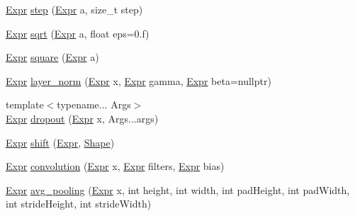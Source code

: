 \begin{DoxyCompactItemize}
\item 
\hyperlink{namespacemarian_a498d8baf75b754011078b890b39c8e12}{Expr} \hyperlink{namespacemarian_a2e7193e67292a4c3347f296f5e669581}{step} (\hyperlink{namespacemarian_a498d8baf75b754011078b890b39c8e12}{Expr} a, size\+\_\+t step)
\item 
\hyperlink{namespacemarian_a498d8baf75b754011078b890b39c8e12}{Expr} \hyperlink{namespacemarian_ac5f147047403fcdab5481c89dc1d8212}{sqrt} (\hyperlink{namespacemarian_a498d8baf75b754011078b890b39c8e12}{Expr} a, float eps=0.f)
\item 
\hyperlink{namespacemarian_a498d8baf75b754011078b890b39c8e12}{Expr} \hyperlink{namespacemarian_a953e6df1fb209a142e066a2546d88c8a}{square} (\hyperlink{namespacemarian_a498d8baf75b754011078b890b39c8e12}{Expr} a)
\item 
\hyperlink{namespacemarian_a498d8baf75b754011078b890b39c8e12}{Expr} \hyperlink{namespacemarian_a6202278a9da8ca8a281a6a96e75082f6}{layer\+\_\+norm} (\hyperlink{namespacemarian_a498d8baf75b754011078b890b39c8e12}{Expr} x, \hyperlink{namespacemarian_a498d8baf75b754011078b890b39c8e12}{Expr} gamma, \hyperlink{namespacemarian_a498d8baf75b754011078b890b39c8e12}{Expr} beta=nullptr)
\item 
{\footnotesize template$<$typename... Args$>$ }\\\hyperlink{namespacemarian_a498d8baf75b754011078b890b39c8e12}{Expr} \hyperlink{namespacemarian_a268400392f22176821c7c4a36733b178}{dropout} (\hyperlink{namespacemarian_a498d8baf75b754011078b890b39c8e12}{Expr} x, Args...\+args)
\item 
\hyperlink{namespacemarian_a498d8baf75b754011078b890b39c8e12}{Expr} \hyperlink{namespacemarian_a763e5e9b5d5a329d2420fe9bab95476d}{shift} (\hyperlink{namespacemarian_a498d8baf75b754011078b890b39c8e12}{Expr}, \hyperlink{structmarian_1_1Shape}{Shape})
\item 
\hyperlink{namespacemarian_a498d8baf75b754011078b890b39c8e12}{Expr} \hyperlink{namespacemarian_a3dbe8b5eb203876cd08cf3fe75a1c6bc}{convolution} (\hyperlink{namespacemarian_a498d8baf75b754011078b890b39c8e12}{Expr} x, \hyperlink{namespacemarian_a498d8baf75b754011078b890b39c8e12}{Expr} filters, \hyperlink{namespacemarian_a498d8baf75b754011078b890b39c8e12}{Expr} bias)
\item 
\hyperlink{namespacemarian_a498d8baf75b754011078b890b39c8e12}{Expr} \hyperlink{namespacemarian_a8ee119d3ee4867a3c826de62ea1de4f5}{avg\+\_\+pooling} (\hyperlink{namespacemarian_a498d8baf75b754011078b890b39c8e12}{Expr} x, int height, int width, int pad\+Height, int pad\+Width, int stride\+Height, int stride\+Width)

\end{DoxyCompactItemize}
